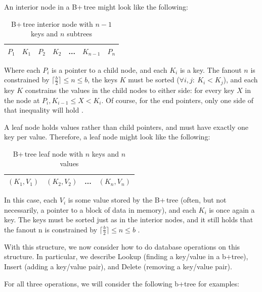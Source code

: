 \documentclass[12pt]{article}
\begin{document}
An interior node in a B+\,tree might look like the following:

\begin{table}[ht]
\centering
\begin{tabular}{|l|l|l|l|l|l|l|}
\hline
$P_1$ & $K_1$ & $P_2$ & $K_2$ & ... & $K_{n-1}$ & $P_n$\\
\hline
\end{tabular}
\caption{B+\,tree interior node with $n-1$ keys and $n$ subtrees}
\label{tab:interior-node}
\end{table}

Where each $P_i$ is a pointer to a child node, and each $K_i$ is a key. The fanout $n$ is constrained by $\lceil \frac{b}{2} \rceil \leq n \leq b$, the keys $K$ must be sorted ($ \forall i, j: \ K_i < K_j$), and each key $K$ constrains the values in the child nodes to either side: for every key $X$ in the node at $P_i, K_{i-1} \leq X < K_i$. Of course, for the end pointers, only one side of that inequality will hold \cite{elmasri_navathe_2011}.

A leaf node holds values rather than child pointers, and must have exactly one key per value. Therefore, a leaf node might look like the following:

\begin{table}[ht]
\centering
\begin{tabular}{|l|l|l|l|}
\hline
$(K_1,V_1)$ & $(K_2,V_2)$ & ... & $(K_n,V_n)$\\
\hline
\end{tabular}
\caption{B+\,tree leaf node with $n$ keys and $n$ values}
\label{tab:leaf-node}
\end{table}

In this case, each $V_i$ is some value stored by the B+\,tree (often, but not necessarily, a pointer to a block of data in memory), and each $K_i$ is once again a key. The keys must be sorted just as in the interior nodes, and it still holds that the fanout n is constrained by $\lceil \frac{b}{2} \rceil \leq n \leq b$ \cite{elmasri_navathe_2011}.

With this structure, we now consider how to do database operations on this structure. In particular, we describe Lookup (finding a key/value in a b+tree), Insert (adding a key/value pair), and Delete (removing a key/value pair).

For all three operations, we will consider the following b+tree for examples:
\end{document}

